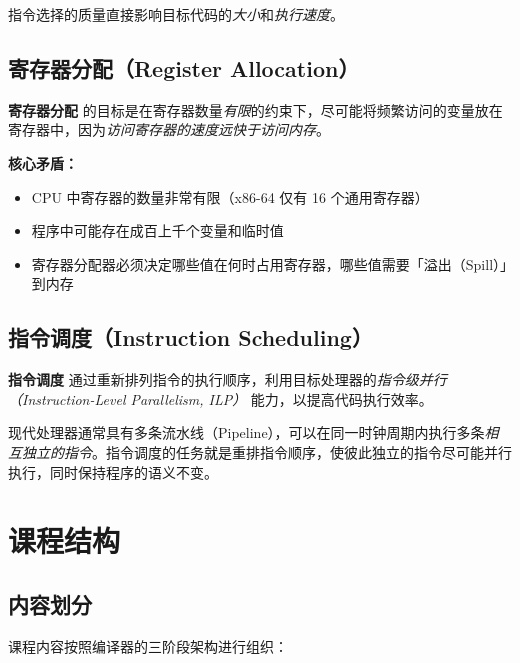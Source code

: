 \documentclass[12pt,a4paper]{ctexart}
\newcommand{\term}[1]{\textbf{\textcolor{mainblue}{#1}}}
\begin{document}
\vspace{0.3em}
指令选择的质量直接影响目标代码的\emph{大小}和\emph{执行速度}。

\subsection{寄存器分配（Register Allocation）}

\begin{keybox}
  \term{寄存器分配} 的目标是在寄存器数量\emph{有限}的约束下，尽可能将频繁访问的变量放在寄存器中，因为\emph{访问寄存器的速度远快于访问内存}。
\end{keybox}

\textbf{核心矛盾：}
\begin{itemize}
  \item CPU 中寄存器的数量非常有限（x86-64 仅有 16 个通用寄存器）
  \item 程序中可能存在成百上千个变量和临时值
  \item 寄存器分配器必须决定哪些值在何时占用寄存器，哪些值需要「溢出（Spill）」到内存
\end{itemize}

\subsection{指令调度（Instruction Scheduling）}

\begin{keybox}
  \term{指令调度} 通过重新排列指令的执行顺序，利用目标处理器的\emph{指令级并行（Instruction-Level Parallelism, ILP）} 能力，以提高代码执行效率。
\end{keybox}

现代处理器通常具有多条流水线（Pipeline），可以在同一时钟周期内执行多条\emph{相互独立的指令}。指令调度的任务就是重排指令顺序，使彼此独立的指令尽可能并行执行，同时保持程序的语义不变。

\newpage

\section{课程结构}

\subsection{内容划分}

课程内容按照编译器的三阶段架构进行组织：
\end{document}
